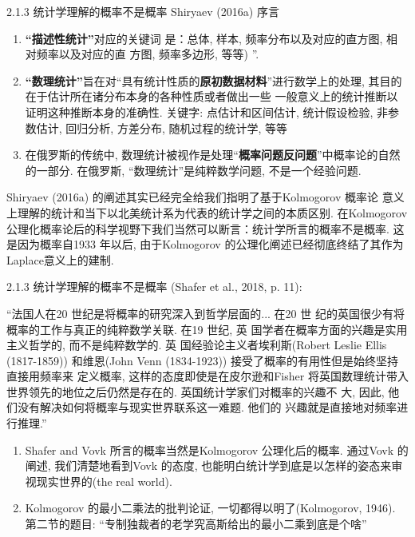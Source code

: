 \documentclass[compress,10pt,dvipsnames,notheorems]{beamer} %
\begin{document}
\begin{frame}{2.1.3 统计学理解的概率不是概率}
Shiryaev (2016a) 序言

\begin{solu}
\begin{enumerate}
\item \textbf{“描述性统计”}对应的关键词
是：总体, 样本, 频率分布以及对应的直方图, 相对频率以及对应的直
方图, 频率多边形, 等等) ”. 
\item \textbf{“数理统计”}旨在对“具有统计性质的\textbf{原初数据材料}”进行数学上的处理, 其目的在于估计所在诸分布本身的各种性质或者做出一些
一般意义上的统计推断以证明这种推断本身的准确性. 关键字: 点估计和区间估计, 统计假设检验, 非参数估计, 回归分析, 方差分布, 随机过程的统计学, 等等
\item 在俄罗斯的传统中, 数理统计被视作是处理“\textbf{概率问题反问题}”中概率论的自然的一部分. 在俄罗斯, “数理统计”是纯粹数学问题, 不是一个经验问题.
\end{enumerate}
\end{solu}

Shiryaev (2016a) 的阐述其实已经完全给我们指明了基于Kolmogorov 概率论
意义上理解的统计和当下以北美统计系为代表的统计学之间的本质区别.
在Kolmogorov 公理化概率论后的科学视野下我们当然可以断言：统计学所言的概率不是概率. 这是因为概率自1933 年以后, 由于Kolmogorov 的公理化阐述已经彻底终结了其作为Laplace意义上的建制.
\end{frame}

\begin{frame}{2.1.3 统计学理解的概率不是概率}
(Shafer et al., 2018, p. 11):

\begin{solu}
“法国人在20 世纪是将概率的研究深入到哲学层面的... 在20 世
纪的英国很少有将概率的工作与真正的纯粹数学关联. 在19 世纪, 英
国学者在概率方面的兴趣是实用主义哲学的, 而不是纯粹数学的. 英
国经验论主义者埃利斯(Robert Leslie Ellis (1817-1859)) 和维恩(John
Venn (1834-1923)) 接受了概率的有用性但是始终坚持直接用频率来
定义概率, 这样的态度即使是在皮尔逊和Fisher 将英国数理统计带入
世界领先的地位之后仍然是存在的. 英国统计学家们对概率的兴趣不
大, 因此, 他们没有解决如何将概率与现实世界联系这一难题. 他们的
兴趣就是直接地对频率进行推理.”
\end{solu}
\begin{enumerate}
\item Shafer and Vovk 所言的概率当然是Kolmogorov 公理化后的概率. 通过Vovk 的阐述, 我们清楚地看到Vovk 的态度, 也能明白统计学到底是以怎样的姿态来审视现实世界的(the real world). 
\item Kolmogorov 的最小二乘法的批判论证, 一切都得以明了(Kolmogorov, 1946). 第二节的题目: “专制独裁者的老学究高斯给出的最小二乘到底是个啥”
\end{enumerate}
\end{frame}
\end{document}
